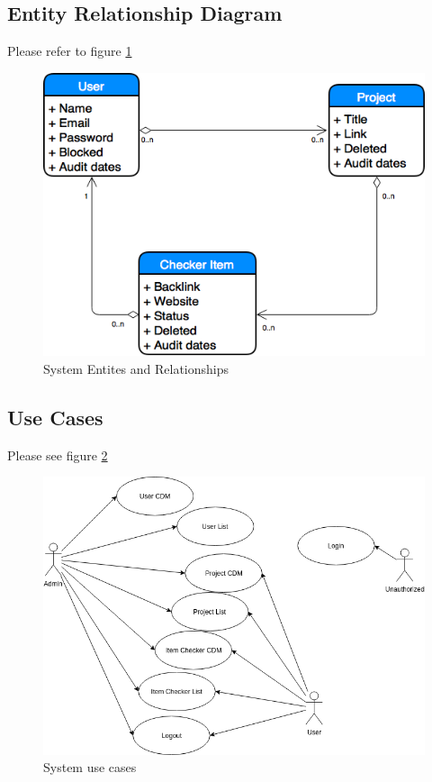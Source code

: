 \subsection{Entity Relationship Diagram}
Please refer to figure \ref{fig:er}
\begin{figure}[ht!]
	\includegraphics[width=\textwidth]{images/Entity-relationship-diagram-Linkchecker}
	\caption{System Entites and Relationships}
	\label{fig:er}
\end{figure}
\subsection{Use Cases}
Please see figure \ref{fig:uc}
\begin{figure}[ht!]
	\includegraphics[width=\textwidth]{images/Use-Cases-Linkchecker}
	\caption{System use cases}
	\label{fig:uc}
\end{figure}

